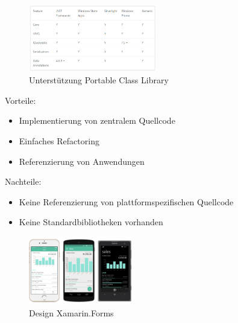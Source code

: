 \begin{figure}[h]
	\begin{center}
		\includegraphics[width=0.5\textwidth]{images/technische_grundlagen/pclSupport.png}
	\end{center}	
	\caption{Unterstützung Portable Class Library \cite{Xamarin.PortableClass}}
\end{figure}

\newpage
\noindent
Vorteile:
\begin{itemize}
	\item Implementierung von zentralem Quellcode
	\item Einfaches Refactoring
	\item Referenzierung von Anwendungen
\end{itemize}
\noindent
Nachteile:
\begin{itemize}
	\item Keine Referenzierung von plattformspezifischen Quellcode
	\item Keine Standardbibliotheken vorhanden
\end{itemize}

\begin{figure}
	\begin{center}
		\includegraphics[width=0.4\textwidth]{images/technische_grundlagen/forms.png}
	\end{center}	
	\caption{Design Xamarin.Forms \cite{Xamarin.Builda}}
	\label{fig:forms}
\end{figure}

